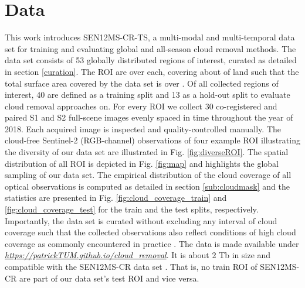 \documentclass[journal]{IEEEtran}
\begin{document}
\section{Data} \label{data}

This work introduces SEN12MS-CR-TS, a multi-modal and multi-temporal data set for training and evaluating global and all-season cloud removal methods. The data set consists of 53 globally distributed regions of interest, curated as detailed in section  \ref{curation}. The ROI are over   each, covering about   of land such that the total surface area covered by the data set is over  . Of all collected regions of interest, 40 are defined as a training split and 13 as a hold-out split to evaluate cloud removal approaches on. For every ROI we collect 30 co-registered and paired S1 and S2 full-scene images evenly spaced in time throughout the year of 2018. Each acquired image is inspected and quality-controlled manually. The cloud-free Sentinel-2 (RGB-channel) observations of four example ROI illustrating the diversity of our data set are illustrated in Fig. \ref{fig:diverseROI}. The spatial distribution of all ROI is depicted in Fig. \ref{fig:map} and highlights the global sampling of our data set. The empirical distribution of the cloud coverage of all optical observations is computed as detailed in section \ref{sub:cloudmask} and the statistics are presented in Fig. \ref{fig:cloud_coverage_train} and \ref{fig:cloud_coverage_test} for the train and the test splits, respectively. Importantly, the data set is curated without excluding any interval of cloud coverage such that the collected observations also reflect conditions of high cloud coverage as commonly encountered in practice \cite{King_Platnick_Menzel_Ackerman_Hubanks_2013}. The data is made available under \textit{\url{https://patrickTUM.github.io/cloud_removal}}. It is about 2 Tb in size and compatible with the SEN12MS-CR data set \cite{ebel2020multisensor}. That is, no train ROI of SEN12MS-CR are part of our data set's test ROI and vice versa.
\end{document}
